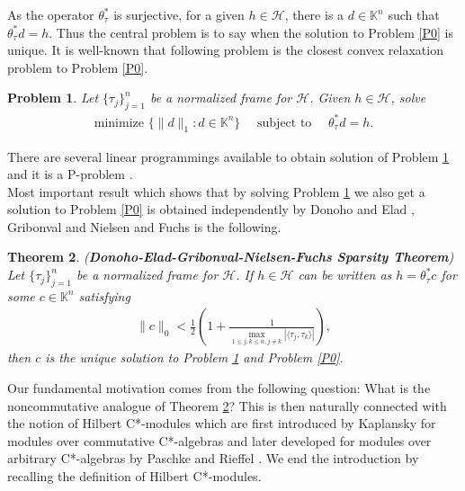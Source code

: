 \documentclass{amsart}
\newtheorem{theorem}{Theorem}[section]
\newtheorem{problem}[theorem]{Problem}
\begin{document}
As the operator $\theta_\tau^*$ is surjective, for a given $h \in \mathcal{H}$, there is a $d\in \mathbb{K}^n$ such that  $\theta_\tau^*d=h.$ Thus the central problem is to say when the  solution to Problem \ref{P0} is unique.   It is well-known that  \cite{CHENDONOHOSAUNDERS, DONOHOHUO, BRUCKSTEINDONOHOELAD}   following problem is the closest convex relaxation problem to Problem \ref{P0}.
\begin{problem} \label{P1}
Let $\{\tau_j\}_{j=1}^n$ be a normalized frame for  $\mathcal{H}$.	Given $h \in \mathcal{H}$, solve 	
	\begin{align*}
		\text{minimize }\{\|d\|_1:d\in \mathbb{K}^n\} \quad \text{ subject to } \quad \theta_\tau^*d=h.
	\end{align*}
\end{problem}
There are several linear programmings available to obtain solution of Problem \ref{P1} and it  is a P-problem \cite{XUEYE, TERLAKY, TILLMANN}.\\
Most important result which shows that by solving Problem \ref{P1} we also get a solution to Problem \ref{P0} is obtained independently by Donoho and Elad \cite{DONOHOELAD},  Gribonval and Nielsen \cite{GRIBONVALNIELSEN} and Fuchs \cite{FUCHS, FUCHS2} is the following.
\begin{theorem}\cite{DONOHOELAD, GRIBONVALNIELSEN, KUTYNIOK, ELAD, FUCHS2, FUCHS}\label{DEGN} (\textbf{Donoho-Elad-Gribonval-Nielsen-Fuchs Sparsity Theorem})
	Let $\{\tau_j\}_{j=1}^n$ be a  normalized frame  for  $\mathcal{H}$. If  
 $h \in \mathcal{H}$ can be written as  $	h=\theta_\tau^*c$ for some  $c\in \mathbb{K}^n$ satisfying 
 \begin{align*}
 \|c\|_0<\frac{1}{2}\left(1+\frac{1}{\displaystyle\max_{1\leq j, k \leq n, j\neq k}|\langle \tau_j, \tau_k\rangle|}\right),
 \end{align*}
 then $c$ is the unique solution to Problem \ref{P1} and Problem \ref{P0}.
\end{theorem}
Our fundamental motivation comes from the following question: What is the noncommutative analogue of Theorem \ref{DEGN}? This is then naturally connected with the notion of Hilbert C*-modules which  are first introduced by Kaplansky \cite{KAPLANSKY} for modules over commutative C*-algebras and later developed for modules over arbitrary C*-algebras by Paschke  \cite{PASCHKE} and Rieffel \cite{RIEFFEL}. We end the introduction by recalling the definition of Hilbert C*-modules. 
\end{document}
